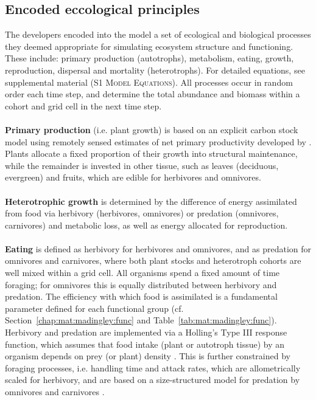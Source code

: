 \subsection{Encoded eccological principles}
\label{chap:mat:madingley:princip}
The developers encoded into the model a set of ecological and biological processes they deemed appropriate for simulating ecosystem structure and functioning. These include: primary production (autotrophs), metabolism, eating, growth, reproduction, dispersal and mortality (heterotrophs). For detailed equations, see supplemental material (S1 \textsc{Model Equations}). All processes occur in random order each time step, and determine the total abundance and biomass within a cohort and grid cell in the next time step. \\\\
\textbf{Primary production} (i.e. plant growth) is based on an explicit carbon stock model using remotely sensed estimates of net primary productivity developed by \cite{Smith2012}. 
Plants allocate a fixed proportion of their growth into structural maintenance, while the remainder is invested in other tissue, such as leaves (deciduous, evergreen) and fruits, which are edible for herbivores and omnivores. 
\\\\
\textbf{Heterotrophic growth} is determined by the difference of energy assimilated from food via herbivory (herbivores, omnivores) or predation (omnivores, carnivores) and metabolic loss, as well as energy allocated for reproduction.\\\\
\textbf{Eating} is defined as herbivory for herbivores and omnivores, and as predation for omnivores and carnivores, where both plant stocks and heterotroph cohorts are well mixed within a grid cell. All organisms spend a fixed amount of time foraging; for omnivores this is equally distributed between herbivory and predation. 
The efficiency with which food is assimilated is a fundamental parameter defined for each functional group (cf. Section~\ref{chap:mat:madingley:func} and Table~\ref{tab:mat:madingley:func}). \\
Herbivory and predation are implemented via a Holling's Type III response function, which assumes that food intake (plant or autotroph tissue) by an organism depends on prey (or plant) density \citep{Denno2012}. 
This is further constrained by foraging processes, i.e. handling time and attack rates, which are allometrically scaled for herbivory, and are based on a size-structured model for predation by omnivores and carnivores \citep[after][; cf. supplemental material for details]{Williams2011}. 
